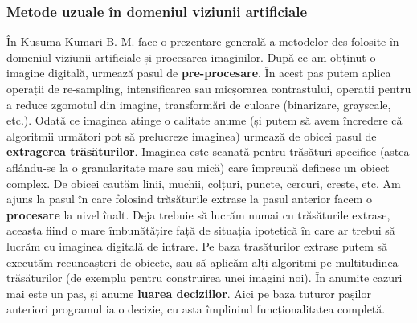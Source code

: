 \subsubsection{Metode uzuale în domeniul viziunii artificiale}
În \cite{M82computervision} Kusuma Kumari B. M. face o prezentare generală a metodelor des folosite în domeniul viziunii artificiale și procesarea imaginilor.\newline
După ce am obținut o imagine digitală, urmează pasul de \textbf{pre-procesare}. În acest pas putem aplica operații de re-sampling, intensificarea sau micșorarea contrastului, operații pentru a reduce zgomotul din imagine, transformări de culoare (binarizare, grayscale, etc.).\newline
Odată ce imaginea atinge o calitate anume (și putem să avem încredere că algoritmii următori pot să prelucreze imaginea) urmează de obicei pasul de \textbf{extragerea trăsăturilor}. Imaginea este scanată pentru trăsături specifice (astea aflându-se la o granularitate mare sau mică) care împreună definesc un obiect complex. De obicei cautăm linii, muchii, colțuri, puncte, cercuri, creste, etc.\newline
Am ajuns la pasul în care folosind trăsăturile extrase la pasul anterior facem o \textbf{procesare} la nivel înalt. Deja trebuie să lucrăm numai cu trăsăturile extrase, aceasta fiind o mare îmbunătățire față de situația ipotetică în care ar trebui să lucrăm cu imaginea digitală de intrare. Pe baza trasăturilor extrase putem să executăm recunoașteri de obiecte, sau să aplicăm alți algoritmi pe multitudinea trăsăturilor (de exemplu pentru construirea unei imagini noi).\newline
În anumite cazuri mai este un pas, și anume \textbf{luarea deciziilor}. Aici pe baza tuturor pașilor anteriori programul ia o decizie, cu asta împlinind funcționalitatea completă.
